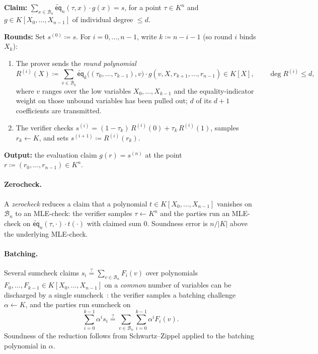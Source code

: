 \documentclass{article}
\theoremstyle{definition}
\newcommand*{\mle}{\widetilde}
\newcommand{\eq}{\mathsf{eq}}
\newcommand{\BB}{\mathcal{B}}
\begin{document}
\begin{protocol}
\label{prot:mle-check}
\textbf{Claim:} $\sum_{x \in \BB_n} \mle{\eq}_n(\tau, x) \cdot g(x) = s$, for a point $\tau \in K^n$ and $g \in K[X_0, \ldots, X_{n - 1}]$ of individual degree $\le d$.

\textbf{Rounds:} Set $s^{(0)} \coloneqq s$. For $i = 0, \ldots, n - 1$, write $k \coloneqq n - i - 1$ (so round $i$ binds $X_k$):
\begin{enumerate}
\item The prover sends the \emph{round polynomial}
\[
  R^{(i)}(X) \coloneqq \sum_{v \in \BB_k} \mle{\eq}_k\bigl( (\tau_0, \ldots, \tau_{k - 1}), v \bigr) \cdot g(v, X, r_{k + 1}, \ldots, r_{n - 1}) \in K[X], \qquad \deg R^{(i)} \le d,
\]
where $v$ ranges over the low variables $X_0, \ldots, X_{k - 1}$ and the equality-indicator weight on those unbound variables has been pulled out; $d$ of its $d + 1$ coefficients are transmitted.
\item The verifier checks $s^{(i)} = (1 - \tau_k)\, R^{(i)}(0) + \tau_k\, R^{(i)}(1)$, samples $r_k \gets K$, and sets $s^{(i + 1)} \coloneqq R^{(i)}(r_k)$.
\end{enumerate}

\textbf{Output:} the evaluation claim $g(r) = s^{(n)}$ at the point $r \coloneqq (r_0, \ldots, r_{n - 1}) \in K^n$.
\end{protocol}

\paragraph{Zerocheck.}
A \emph{zerocheck} reduces a claim that a polynomial $t \in K[X_0, \ldots, X_{n - 1}]$ vanishes on $\BB_n$ to an MLE-check: the verifier samples $\tau \gets K^n$ and the parties run an MLE-check on $\mle{\eq}_n(\tau, \cdot) \cdot t(\cdot)$ with claimed sum $0$. Soundness error is $n / |K|$ above the underlying MLE-check.

\paragraph{Batching.}
Several sumcheck claims $s_i \stackrel{?}{=} \sum_{v \in \BB_n} F_i(v)$ over polynomials $F_0, \ldots, F_{k - 1} \in K[X_0, \ldots, X_{n - 1}]$ on a \emph{common} number of variables can be discharged by a single sumcheck~\cite{cryptoeprint:2017/305}: the verifier samples a batching challenge $\alpha \gets K$, and the parties run sumcheck on
\[
  \sum_{i = 0}^{k - 1} \alpha^i s_i \stackrel{?}{=} \sum_{v \in \BB_n} \sum_{i = 0}^{k - 1} \alpha^i F_i(v).
\]
Soundness of the reduction follows from Schwartz--Zippel applied to the batching polynomial in $\alpha$.
\end{document}
